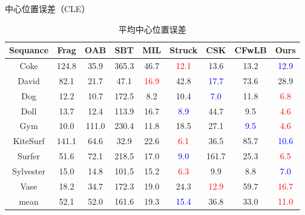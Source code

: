 \begin{frame}{中心位置误差（CLE）}
\begin{table}[htbp]
\centering
\renewcommand{\arraystretch}{1.3}
\captionsetup{belowskip=2pt,aboveskip=4pt}

\caption{平均中心位置误差}
\begin{adjustbox}{max width=\textwidth}
    \begin{tabular}{|c|c|c|c|c|c|c|c|c|}
        \hline
        Sequance  & Frag  &  OAB  &  SBT  &  MIL  & Struck & CSK   & CFwLB   &  Ours \\ \hline
        
        Coke      & 124.8 & 35.9  & 365.3 & 46.7  &  \textcolor{red}{12.1}  & 13.6  & 13.2   &   \textcolor{blue}{12.9}  \\ \hline
        David     & 82.1  & 21.7  & 47.1  & \textcolor{red}{16.9}  & 42.8   &  \textcolor{blue}{17.7} & 73.6   &   28.9  \\ \hline
        Dog       & 12.2  & 10.7  & 172.5 & 8.2   &  10.4  &  \textcolor{blue}{7.0}  & 11.8   & \textcolor{red}{6.8}  \\ \hline
        Doll      & 13.7  & 12.4  & 113.9 & 16.7  & \textcolor{blue}{8.9}&  44.7 & 9.5    & \textcolor{red}{ 4.6} \\ \hline
        Gym       & 10.0  & 111.0 & 230.4 & 11.8  & 18.5   &  27.1 & \textcolor{blue}{9.5}  & \textcolor{red}{ 4.6} \\ \hline
        KiteSurf  & 141.1 & 64.6  & 32.9  & 22.6  & \textcolor{red}{6.1}   &  36.5 & 85.7    & \textcolor{blue}{10.6} \\ \hline
        Surfer    & 51.6  & 72.1  & 218.5 & 17.0  &\textcolor{blue}{9.0}   & 161.7 & 25.3    & \textcolor{red}{6.5} \\ \hline
        Sylvester & 15.0  & 14.8  & 101.5 & 15.2  &\textcolor{red}{6.3}  &  9.9  & 8.8    & \textcolor{blue}{7.0} \\ \hline
        Vase      & 18.2  & 34.7  & 172.3 & 19.0  &  24.3   & \textcolor{red}{12.9} & 59.7    & \textcolor{red}{16.7} \\ \hline \hline

    mean      & 52.1  &  52.0 & 161.6 & 19.3  & \textcolor{blue}{15.4}  & 36.8 & 33.0 & \textcolor{red}{11.0} \\ \hline

\end{tabular}
\end{adjustbox}
\label{tab:CFwLB_CLE}
\end{table}
\end{frame}

